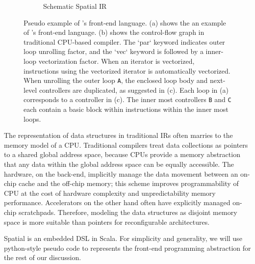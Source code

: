 \begin{figure}
\begin{subfigure}[b]{0.25\textwidth}
\caption{Schematic Spatial IR}
\end{subfigure}
\caption[Spatial Example]{
  Pseudo example of \name's front-end language.
  (a) shows the an example of \name's front-end language. 
  (b) shows the control-flow graph in traditional CPU-based compiler.
  The `par` keyword indicates outer loop unrolling factor, and
  the `vec` keyword is followed by a inner-loop vectorization factor.
  When an iterator is vectorized, instructions using the vectorized iterator is automatically
  vectorized. When unrolling the outer loop \texttt{A}, the enclosed loop body and
  next-level controllers are duplicated, as suggested in (c).
  Each loop in (a) corresponds to a controller in (c). The inner most controllers \texttt{B} and
  \texttt{C} each contain a basic block within instructions within the inner most loops.
}
\label{fig:spatialegpar}
\end{figure}

The representation of data structures in traditional IRs often marries to the memory model of a 
CPU. Traditional compilers treat data collections as pointers to a shared
global address space, because
CPUs provide a memory abstraction that any data within the global address space 
can be equally accessible.
The hardware, on the back-end, implicitly manage the data movement between an on-chip cache and the off-chip 
memory; this scheme improves programmability of CPU at the cost of hardware complexity and unpredictability memory
performance.
Accelerators on the other hand often have explicitly managed on-chip scratchpads.
Therefore, modeling the data structures as disjoint memory space is more suitable than pointers for reconfigurable architectures.

Spatial is an embedded DSL in Scala.
For simplicity and generality, we will use python-style pseudo code to represents the front-end programming
abstraction for the rest of our discussion.
